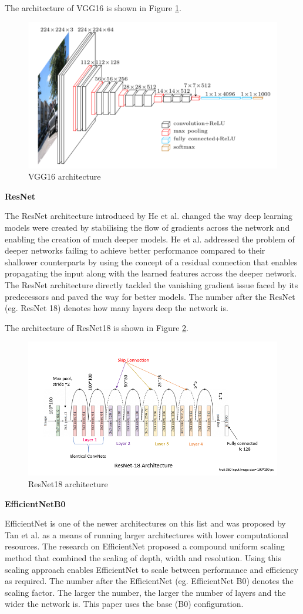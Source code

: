 The architecture of VGG16 is shown in Figure \ref{fig:vgg16}.

\begin{figure}[!htb]
    \centering
    \includegraphics[width=.6\linewidth]{images/vggarch.png}
    \caption{VGG16 architecture}
    \label{fig:vgg16}
\end{figure}

\textbf{ResNet}

The ResNet architecture \cite{heDeepResidualLearning2016} introduced by He et al. changed the way deep learning models were created by stabilising the flow of gradients across the network and enabling the creation of much deeper models. He et al. addressed the problem of deeper networks failing to achieve better performance compared to their shallower counterparts by using the concept of a residual connection that enables propagating the input along with the learned features across the deeper network. The ResNet architecture directly tackled the vanishing gradient issue faced by its predecessors and paved the way for better models. The number after the ResNet (eg. ResNet 18) denotes how many layers deep the network is.

The architecture of ResNet18 is shown in Figure \ref{fig:resnet18}.
\begin{figure}[!htb]
    \centering
    \includegraphics[width=.6\linewidth]{images/resnetarch.png}
    \caption{ResNet18 architecture}
    \label{fig:resnet18}
\end{figure}

\textbf{EfficientNetB0}

EfficientNet is one of the newer architectures on this list and was proposed by Tan et al. as a means of running larger architectures with lower computational resources. The research on EfficientNet proposed a compound uniform scaling method that combined the scaling of depth, width and resolution. Using this scaling approach enables EfficientNet to scale between performance and efficiency as required. The number after the EfficientNet (eg. EfficientNet B0) denotes the scaling factor. The larger the number, the larger the number of layers and the wider the network is. This paper uses the base (B0) configuration.

